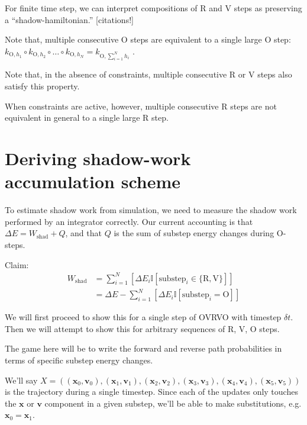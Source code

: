 \documentclass[11pt]{article}
\newcommand{\x}{\mathbf{x}}
\newcommand{\vel}{\mathbf{v}}
\newcommand{\ind}{\mathbb{I}} %
\newcommand{\pair}[1]{(\x_{#1}, \vel_{#1})}
\begin{document}
For finite time step, we can interpret compositions of R and V steps as preserving a ``shadow-hamiltonian.'' [citations!]

Note that, multiple consecutive O steps are equivalent to a single large O step: $k_{\text{O}, h_1} \circ k_{\text{O}, h_2} \circ \dots \circ  k_{\text{O}, h_N} = k_{\text{O}, \sum_{i=1}^N h_i} $ .

Note that, in the absence of constraints, multiple consecutive R or V steps also satisfy this property.

When constraints are active, however, multiple consecutive R steps are not equivalent in general to a single large R step.

\section{Deriving shadow-work accumulation scheme}
To estimate shadow work from simulation, we need to measure the shadow work performed by an integrator correctly.
Our current accounting is that $\Delta E = W_\text{shad} + Q$, and that $Q$ is the sum of substep energy changes during O-steps.

Claim: $$\begin{aligned}
W_\text{shad} &= \sum_{i=1}^N [\Delta E_i \ind [\text{substep}_i \in \{\text{R}, \text{V}\}]]\\
&= \Delta E - \sum_{i=1}^N [\Delta E_i \ind [\text{substep}_i = \text{O}]] \end{aligned}$$

We will first proceed to show this for a single step of OVRVO with timestep $\delta t$. Then we will attempt to show this for arbitrary sequences of R, V, O steps.

The game here will be to write the forward and reverse path probabilities in terms of specific substep energy changes.

We'll say $X=(\pair{0}, \pair{1}, \pair{2}, \pair{3}, \pair{4}, \pair{5})$ is the trajectory during a single timestep.
Since each of the updates only touches the $\x$ or $\vel$ component in a given substep, we'll be able to make substitutions, e.g. $\x_0 = \x_{1}$.
\end{document}
